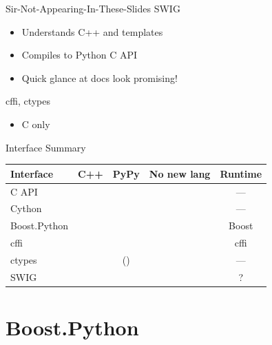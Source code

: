 \documentclass{beamer}
\begin{document}
\begin{frame}{Sir-Not-Appearing-In-These-Slides}
  SWIG
  \begin{itemize}
    \item Understands C++ and templates
    \item Compiles to Python C API
    \item Quick glance at docs look promising!
  \end{itemize}
  cffi, ctypes
  \begin{itemize}
    \item C only
  \end{itemize}
\end{frame}

\begin{frame}{Interface Summary}
  \def\yes{\textcolor{green!50!black}{\CheckmarkBold}}
  \def\no{\textcolor{red}{\XSolidBrush}}
  \begin{table}
    \begin{tabular}{lcccc}
      \toprule
      Interface & C++ & PyPy & No new lang & Runtime\\
      \midrule
      C API & \no & \no & \yes & ---\\
      Cython & \yes & \no & \no & ---\\
      Boost.Python & \yes & \no & \yes & Boost\\
      cffi  & \no & \yes & \yes & cffi\\
      ctypes & \no & (\yes) & \yes & ---\\
      SWIG & \yes & \no & \no & ?\\
      \bottomrule
    \end{tabular}
  \end{table}
\end{frame}


\section{Boost.Python}
\end{document}
